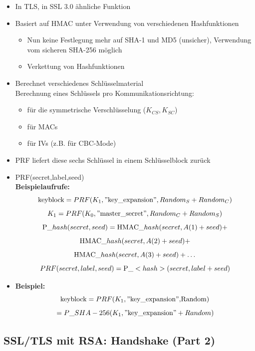 \documentclass[openany]{book}
\begin{document}
\begin{itemize}
    \item In TLS, in SSL 3.0 ähnliche Funktion
    \item Basiert auf HMAC unter Verwendung von verschiedenen Hashfunktionen
    \begin{itemize}
        \item Nun keine Festlegung mehr auf SHA-1 und MD5 (unsicher), Verwendung vom sicheren SHA-256 möglich
        \item Verkettung von Hashfunktionen
    \end{itemize}
    \item Berechnet verschiedenes Schlüsselmaterial \\ Berechnung eines Schlüssels pro Kommunikationsrichtung:
    \begin{itemize}
        \item für die symmetrische Verschlüsselung ($K_{CS},K_{SC}$)
        \item für MACs
        \item für IVs (z.B. für CBC-Mode)
    \end{itemize}
    \item PRF liefert diese sechs Schlüssel in einem Schlüsselblock zurück
    \item PRF(secret,label,seed) \\ \textbf{Beispielaufrufe:}\\ $$\text{keyblock}=PRF(K_1,\text{''key\textunderscore expansion''}, Random_S + Random_C)$$ $$K_1=PRF(K_0,\text{''master\textunderscore secret''}, Random_C+Random_S)$$ $$\text{P\textunderscore}hash(secret,seed)= \text{HMAC\textunderscore}hash(secret, A(1)+seed)+$$ $$\text{HMAC\textunderscore}hash(secret,A(2)+seed)+$$ $$\text{HMAC\textunderscore}hash(secret,A(3)+seed)+\dots$$ $$\\ PRF(secret,label,seed) = \text{P\textunderscore}<hash>(secret,label+seed)$$
    \item \textbf{Beispiel:} $$\text{keyblock} = PRF(K_1,\text{''key\textunderscore expansion'',Random})$$$$=P\text{\textunderscore}SHA-256(K_1,\text{''key\textunderscore expansion''}+Random)$$
\end{itemize}

\subsection{SSL/TLS mit RSA: Handshake (Part 2)}
\end{document}
